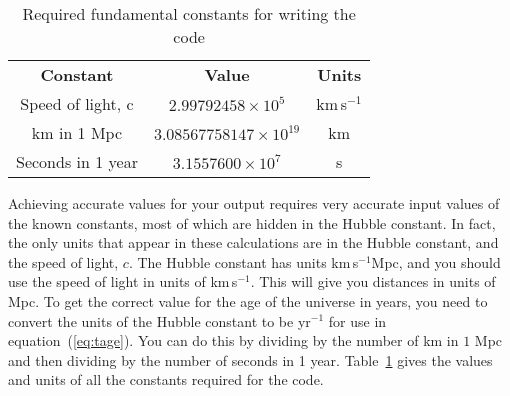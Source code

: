 \documentclass[]{article}
\begin{document}
\begin{table}
\caption{Required fundamental constants for writing the code}
\centering
\label{table:constants}
\begin{tabular}{c c c}
\\ [0.05ex]
\hline
\textbf{Constant} & \textbf{Value} & \textbf{Units} \\ [0.5ex]
Speed of light, c & $2.99792458\times 10^5$ & km$\,$s$^{-1}$\\
km in 1 Mpc & $3.08567758147\times 10^{19}$ & km\\
Seconds in 1 year & $3.1557600\times 10^7$ & s\\
\hline
\end{tabular}
\end{table}

\noindent Achieving accurate values for your output requires very accurate input values of the known constants, most of which are hidden in the Hubble constant. In fact, the only units that appear in these calculations are in the Hubble constant, and the speed of light, $c$. The Hubble constant has units km$\,$s$^{-1}$Mpc, and you should use the speed of light in units of km$\,$s$^{-1}$. This will give you distances in units of Mpc. To get the correct value for the age of the universe in years, you need to convert the units of the Hubble constant to be yr$^{-1}$ for use in equation~(\ref{eq:tage}). You can do this by dividing by the number of km in $1$ Mpc and then dividing by the number of seconds in 1 year.  Table~\ref{table:constants} gives the values and units of all the constants required for the code. 
\end{document}
